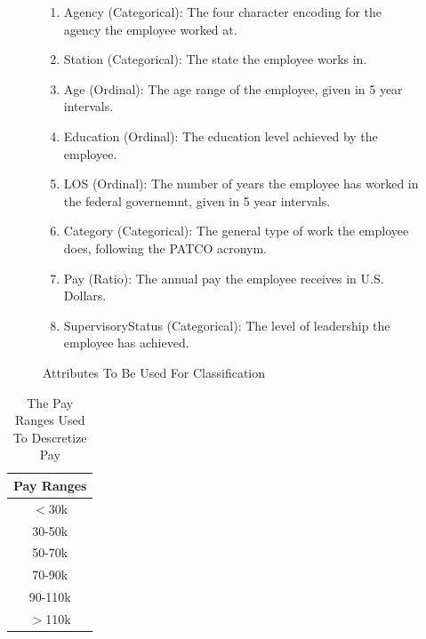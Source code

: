 \documentclass{article}
\begin{document}
    \begin{center}
        \begin{figure}
            \begin{enumerate}
                \item Agency (Categorical): The four character encoding for the agency the employee worked at.
                \item Station (Categorical): The state the employee works in.
                \item Age (Ordinal): The age range of the employee, given in 5 year intervals.
                \item Education (Ordinal): The education level achieved by the employee.
                \item LOS (Ordinal): The number of years the employee has worked in the federal governemnt, given in 5 year intervals.
                \item Category (Categorical): The general type of work the employee does, following the PATCO acronym.
                \item Pay (Ratio): The annual pay the employee receives in U.S. Dollars.
                \item SupervisoryStatus (Categorical): The level of leadership the employee has achieved.
            \end{enumerate}
            \caption{Attributes To Be Used For Classification}
            \label{tab:1}
        \end{figure}
    \end{center}

    \begin{center}
        \begin{table}
            \centering
            \begin{tabular}{ |c| }
                \hline
                Pay Ranges \\
                \hline
                $<$30k \\
                30-50k \\
                50-70k \\
                70-90k \\
                90-110k \\
                $>$110k \\
                \hline
            \end{tabular}
            \caption{The Pay Ranges Used To Descretize Pay}
            \label{tab:2}
        \end{table}
    \end{center}
\end{document}
